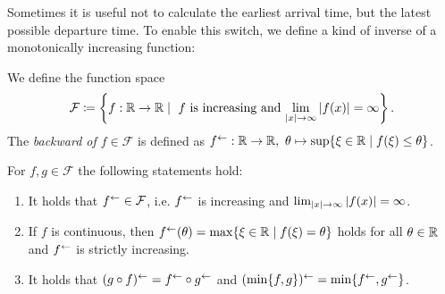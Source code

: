 Sometimes it is useful not to calculate the earliest arrival time, but the latest possible departure time.
To enable this switch, we define a kind of inverse of a monotonically increasing function:



\newcommand{\IncCoercive}{\mathcal{F}}
\begin{definition}
    We define the function space 
    \[
        \IncCoercive \coloneqq \left\{ f:\R \rightarrow \R \mid \text{ $f$ is increasing and $ \lim_{\abs{x}\rightarrow\infty} \abs{f(x)} = \infty$} \right\}.
    \]
    The \emph{backward of $f\in\IncCoercive$} is defined as $\minv{f}:\R \rightarrow \R,\ \theta\mapsto \sup \{ \xi\in\R \mid f(\xi) \leq \theta \}$.
\end{definition}

\begin{proposition}
    For $f,g\in \IncCoercive$ the following statements hold:
    \begin{enumerate}[label=(\roman*)]
        \item\label{prop:backward-props:inner-operator} It holds that $\minv{f}\in\IncCoercive$, i.e. $f^{\leftarrow}$ is increasing and $\lim_{\left| x \right|\rightarrow\infty} \left| f(x) \right| = \infty$.
        \item\label{prop:backward-props:continuous} If $f$ is continuous, then $f^{\leftarrow}(\theta) = \max \{ \xi\in\mathbb{R} \mid f(\xi) = \theta \}$ holds for all $\theta\in\mathbb{R}$ and $f^{\leftarrow}$ is strictly increasing.
        \item\label{prop:backward-props:composition-minimum} It holds that $(g\circ f)^{\leftarrow} = f^{\leftarrow}\circ g^{\leftarrow}$ and $(\min\{f,g\})^{\leftarrow} = \min\{f^{\leftarrow}, g^{\leftarrow}\}$.
    \end{enumerate}
\end{proposition}
